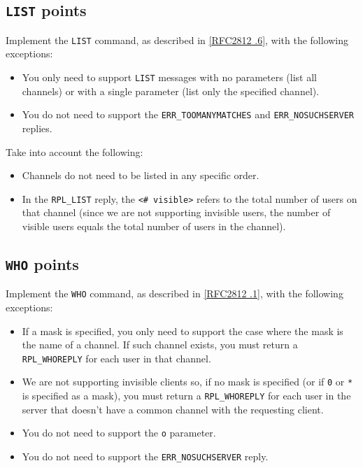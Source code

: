 \documentclass[10pt]{article}
\newcommand{\RFCsection}[2]{\href{http://tools.ietf.org/html/rfc#1\#section-#2}{[RFC#1 \textsection #2]}}
\newcommand{\points}[1]{{\sffamily\mdseries\guillemotleft #1 points\guillemotright{}}}
\begin{document}
\subsection{\texttt{LIST} \points{5}}

Implement the \texttt{LIST} command, as described in \RFCsection{2812}{3.2.6}, with the following exceptions:

\begin{itemize}
\item You only need to support \texttt{LIST} messages with no parameters (list all channels) or with a single parameter (list only the specified channel).
\item You do not need to support the \texttt{ERR\_TOOMANYMATCHES} and \texttt{ERR\_NOSUCHSERVER} replies.
\end{itemize}

\noindent Take into account the following:

\begin{itemize}
\item Channels do not need to be listed in any specific order.
\item In the \texttt{RPL\_LIST} reply, the \texttt{<\# visible>} refers to the total number of users on that channel (since we are not supporting invisible users, the number of visible users equals the total number of users in the channel).
\end{itemize}


\subsection{\texttt{WHO} \points{5}}

Implement the \texttt{WHO} command, as described in \RFCsection{2812}{3.6.1}, with the following exceptions:

\begin{itemize}
\item If a mask is specified, you only need to support the case where the mask is the name of a channel. If such channel exists, you must return a \texttt{RPL\_WHOREPLY} for each user in that channel.
\item We are not supporting invisible clients so, if no mask is specified (or if \texttt{0} or \texttt{*} is specified as a mask), you must return a \texttt{RPL\_WHOREPLY} for each user in the server that doesn't have a common channel with the requesting client. 
\item You do not need to support the \texttt{o} parameter.
\item You do not need to support the \texttt{ERR\_NOSUCHSERVER} reply.
\end{itemize}
\end{document}
